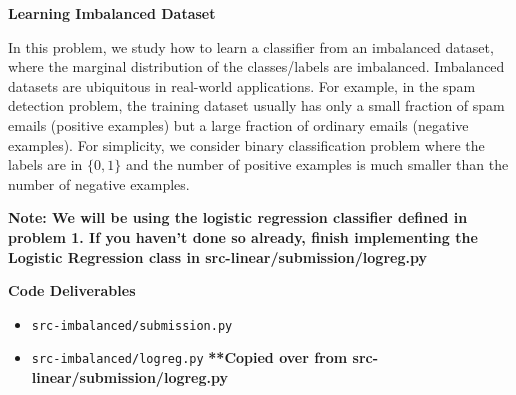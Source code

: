 \item {\bf Learning Imbalanced Dataset}

In this problem, we study how to learn a classifier from an imbalanced dataset, where the marginal distribution 
of the classes/labels are imbalanced. Imbalanced datasets are ubiquitous in real-world applications. For example, 
in the spam detection problem, the training dataset usually has only a small fraction of spam emails 
(positive examples) but a large fraction of ordinary emails (negative examples). 
For simplicity, we consider binary classification problem where the labels are in $\{0,1\}$ 
and the number of positive examples is much smaller than the number of negative examples.

\textbf{Note: We will be using the logistic regression classifier defined in problem 1. If you haven't done so 
already, finish implementing the Logistic Regression class in src-linear/submission/logreg.py}

\textbf{Code Deliverables}
\begin{itemize}
    \item \texttt{src-imbalanced/submission.py}
    \item \texttt{src-imbalanced/logreg.py} \textbf{   **Copied over from src-linear/submission/logreg.py}
\end{itemize}

\begin{enumerate}
    

    

    

    
\end{enumerate}

